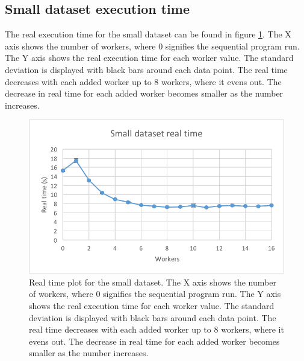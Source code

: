\subsection{Small dataset execution time}
The real execution time for the small dataset can be found in figure \ref{fig:dataset_2_real_time}.
The X axis shows the number of workers, where 0 signifies the sequential program run.
The Y axis shows the real execution time for each worker value. The standard deviation is displayed with black bars around each data point. The real time
decreases with each added worker up to 8 workers, where it evens out. The decrease in real time for each added worker becomes smaller as the number increases.
\begin{figure}[ht]
  \centering
  \includegraphics[width=120mm]{figures/dataset_2/dataset_2_real_time.png}
  \caption[Real time plot for the small dataset.]{Real time plot for the small dataset. The X axis shows the number of workers, where 0 signifies the sequential program run.
  The Y axis shows the real execution time for each worker value. The standard deviation is displayed with black bars around each data point. The real time
  decreases with each added worker up to 8 workers, where it evens out. The decrease in real time for each added worker becomes smaller as the number increases.}
  \label{fig:dataset_2_real_time}
\end{figure}

